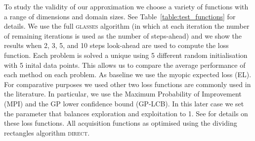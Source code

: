\documentclass[twoside]{article}
\newcommand{\acr}[1]{\textsc{#1}\xspace}
\newcommand{\us}{\acr{glasses}}
\newcommand{\direct}{\acr{direct}}
\begin{document}
To study the validity of our approximation we choose a variety of functions with a range of dimensions and domain sizes. See Table~\ref{table:test_functions} for details. We use the full \us algorithm (in which at each iteration the number of remaining iterations is used as the number of steps-ahead) and we show the results when 2, 3, 5, and 10 steps look-ahead are used to compute the loss function. Each problem is solved a unique using 5 different random initialisation with 5 inital data points. This allows us to compare the average performance of each method on each problem. As baseline we use the myopic expected loss (EL). For comparative purposes we used other two loss functions are commonly used in the literature. In particular, we use the Maximum Probability of Improvement (MPI) and the GP lower confidence bound (GP-LCB). In this later case we set the parameter that balances exploration and exploitation to 1. See \citep{Snoek*Larochelle*Adams_2012} for details on these loss functions. All acquisition functions as optimised using the dividing rectangles algorithm \direct \citep{Jones1993}.
\end{document}

